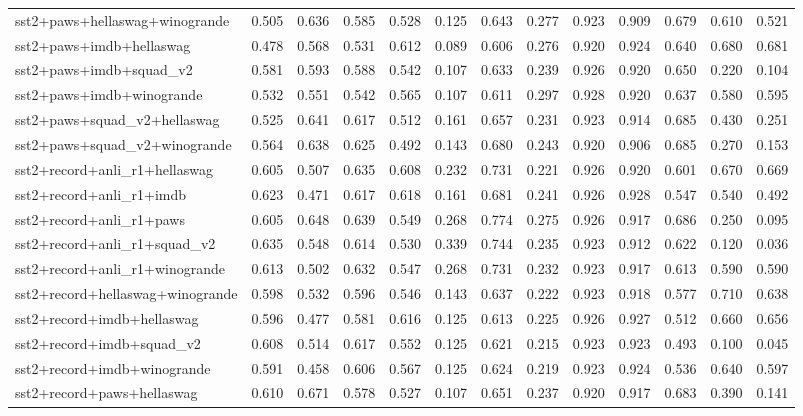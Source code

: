 \begin{table}[t]
\begin{tabular}{lrrrrrrrrrrrr}
    sst2+paws+hellaswag+winogrande & 0.505 & 0.636 & 0.585 & 0.528 & 0.125 & 0.643 & 0.277 & 0.923 & 0.909 & 0.679 & 0.610 & 0.521 \\
    sst2+paws+imdb+hellaswag & 0.478 & 0.568 & 0.531 & 0.612 & 0.089 & 0.606 & 0.276 & 0.920 & 0.924 & 0.640 & 0.680 & 0.681 \\
    sst2+paws+imdb+squad\_v2 & 0.581 & 0.593 & 0.588 & 0.542 & 0.107 & 0.633 & 0.239 & 0.926 & 0.920 & 0.650 & 0.220 & 0.104 \\
    sst2+paws+imdb+winogrande & 0.532 & 0.551 & 0.542 & 0.565 & 0.107 & 0.611 & 0.297 & 0.928 & 0.920 & 0.637 & 0.580 & 0.595 \\
    sst2+paws+squad\_v2+hellaswag & 0.525 & 0.641 & 0.617 & 0.512 & 0.161 & 0.657 & 0.231 & 0.923 & 0.914 & 0.685 & 0.430 & 0.251 \\
    sst2+paws+squad\_v2+winogrande & 0.564 & 0.638 & 0.625 & 0.492 & 0.143 & 0.680 & 0.243 & 0.920 & 0.906 & 0.685 & 0.270 & 0.153 \\
    sst2+record+anli\_r1+hellaswag & 0.605 & 0.507 & 0.635 & 0.608 & 0.232 & 0.731 & 0.221 & 0.926 & 0.920 & 0.601 & 0.670 & 0.669 \\
    sst2+record+anli\_r1+imdb & 0.623 & 0.471 & 0.617 & 0.618 & 0.161 & 0.681 & 0.241 & 0.926 & 0.928 & 0.547 & 0.540 & 0.492 \\
    sst2+record+anli\_r1+paws & 0.605 & 0.648 & 0.639 & 0.549 & 0.268 & 0.774 & 0.275 & 0.926 & 0.917 & 0.686 & 0.250 & 0.095 \\
    sst2+record+anli\_r1+squad\_v2 & 0.635 & 0.548 & 0.614 & 0.530 & 0.339 & 0.744 & 0.235 & 0.923 & 0.912 & 0.622 & 0.120 & 0.036 \\
    sst2+record+anli\_r1+winogrande & 0.613 & 0.502 & 0.632 & 0.547 & 0.268 & 0.731 & 0.232 & 0.923 & 0.917 & 0.613 & 0.590 & 0.590 \\
    sst2+record+hellaswag+winogrande & 0.598 & 0.532 & 0.596 & 0.546 & 0.143 & 0.637 & 0.222 & 0.923 & 0.918 & 0.577 & 0.710 & 0.638 \\
    sst2+record+imdb+hellaswag & 0.596 & 0.477 & 0.581 & 0.616 & 0.125 & 0.613 & 0.225 & 0.926 & 0.927 & 0.512 & 0.660 & 0.656 \\
    sst2+record+imdb+squad\_v2 & 0.608 & 0.514 & 0.617 & 0.552 & 0.125 & 0.621 & 0.215 & 0.923 & 0.923 & 0.493 & 0.100 & 0.045 \\
    sst2+record+imdb+winogrande & 0.591 & 0.458 & 0.606 & 0.567 & 0.125 & 0.624 & 0.219 & 0.923 & 0.924 & 0.536 & 0.640 & 0.597 \\
    sst2+record+paws+hellaswag & 0.610 & 0.671 & 0.578 & 0.527 & 0.107 & 0.651 & 0.237 & 0.920 & 0.917 & 0.683 & 0.390 & 0.141 \\

\end{tabular}
\end{table}
